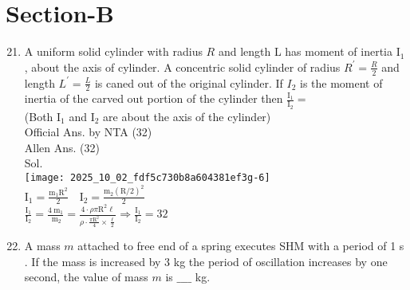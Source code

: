 \documentclass[10pt]{article}
\begin{document}
\section*{Section-B}
\begin{enumerate}
  \setcounter{enumi}{20}
  \item A uniform solid cylinder with radius \(R\) and length L has moment of inertia \(\mathrm{I}_{1}\), about the axis of cylinder. A concentric solid cylinder of radius \(R^{\prime}=\frac{R}{2}\) and length \(L^{\prime}=\frac{L}{2}\) is caned out of the original cylinder. If \(I_{2}\) is the moment of inertia of the carved out portion of the cylinder then \(\frac{\mathrm{I}_{1}}{\mathrm{I}_{2}}=\)\\
(Both \(\mathrm{I}_{1}\) and \(\mathrm{I}_{2}\) are about the axis of the cylinder)\\
Official Ans. by NTA (32)\\
Allen Ans. (32)\\
Sol.\\
\texttt{[image: 2025\_10\_02\_fdf5c730b8a604381ef3g-6]}\\
\(\mathrm{I}_{1}=\frac{\mathrm{m}_{1} \mathrm{R}^{2}}{2} \quad \mathrm{I}_{2}=\frac{\mathrm{m}_{2}(\mathrm{R} / 2)^{2}}{2}\)\\
\(\frac{\mathrm{I}_{1}}{\mathrm{I}_{2}}=\frac{4 \mathrm{~m}_{1}}{\mathrm{~m}_{2}}=\frac{4 \cdot \rho \pi \mathrm{R}^{2} \ell}{\rho \cdot \frac{\pi \mathrm{R}^{2}}{4} \times \frac{\ell}{2}} \Rightarrow \frac{\mathrm{I}_{1}}{\mathrm{I}_{2}}=32\)
  \item A mass \(m\) attached to free end of a spring executes SHM with a period of 1 s . If the mass is increased by 3 kg the period of oscillation increases by one second, the value of mass \(m\) is \(\_\_\_\_\) kg.
\end{enumerate}
\end{document}
